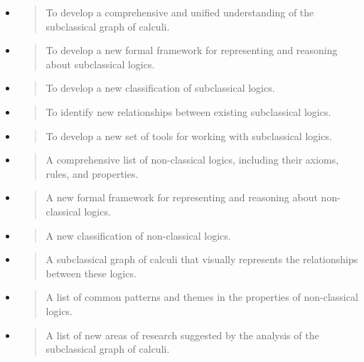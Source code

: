 \begin{itemize}
\begin{quote}
  \end{quote}
\item
  \begin{quote}
  To develop a comprehensive and unified understanding of the
  subclassical graph of calculi.
  \end{quote}
\item
  \begin{quote}
  To develop a new formal framework for representing and reasoning about
  subclassical logics.
  \end{quote}
\item
  \begin{quote}
  To develop a new classification of subclassical logics.
  \end{quote}
\item
  \begin{quote}
  To identify new relationships between existing subclassical logics.
  \end{quote}
\item
  \begin{quote}
  To develop a new set of tools for working with subclassical logics.
  \end{quote}
\item
  \begin{quote}
  A comprehensive list of non-classical logics, including their axioms,
  rules, and properties.
  \end{quote}
\item
  \begin{quote}
  A new formal framework for representing and reasoning about
  non-classical logics.
  \end{quote}
\item
  \begin{quote}
  A new classification of non-classical logics.
  \end{quote}
\item
  \begin{quote}
  A subclassical graph of calculi that visually represents the
  relationships between these logics.
  \end{quote}
\item
  \begin{quote}
  A list of common patterns and themes in the properties of
  non-classical logics.
  \end{quote}
\item
  \begin{quote}
  A list of new areas of research suggested by the analysis of the
  subclassical graph of calculi.

\end{quote}
\end{itemize}
